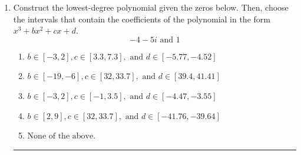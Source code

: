 \documentclass[14pt]{extbook}
\newcommand{\litem}[1]{\item#1\hspace*{-1cm}\rule{\textwidth}{0.4pt}}
\begin{document}
\begin{enumerate}
\litem{
Construct the lowest-degree polynomial given the zeros below. Then, choose the intervals that contain the coefficients of the polynomial in the form $x^3+bx^2+cx+d$.\[ -4 - 5 i \text{ and } 1 \]\begin{enumerate}[label=\Alph*.]
\item \( b \in [-3, 2], c \in [3.3, 7.3], \text{ and } d \in [-5.77, -4.52] \)
\item \( b \in [-19, -6], c \in [32, 33.7], \text{ and } d \in [39.4, 41.41] \)
\item \( b \in [-3, 2], c \in [-1, 3.5], \text{ and } d \in [-4.47, -3.55] \)
\item \( b \in [2, 9], c \in [32, 33.7], \text{ and } d \in [-41.76, -39.64] \)
\item \( \text{None of the above.} \)


\end{enumerate}}
\end{enumerate}
\end{document}

